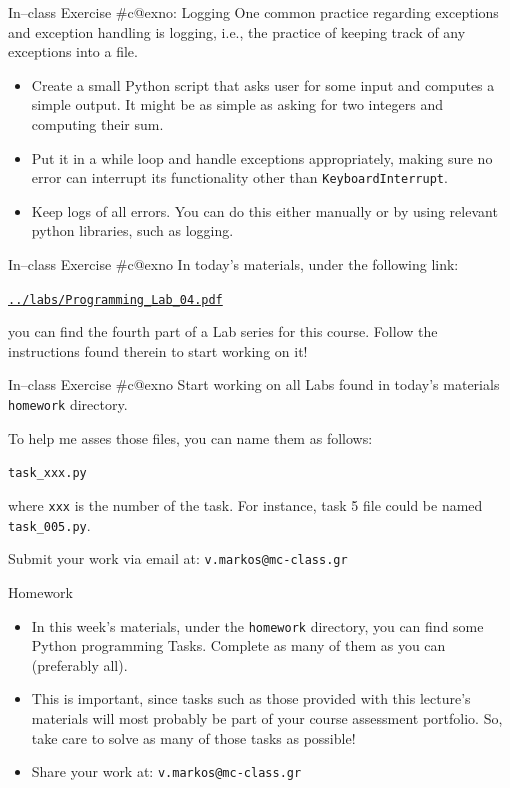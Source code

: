 \documentclass[aspectratio=169, 12pt, xcolor=table]{beamer}
\makeatletter
\newcommand{\ohref}[1]{\href{#1}{\texttt{#1}}}
\newcommand{\arabicthree}[1]{\expandafter\@arabicthree\csname c@#1\endcsname}
\newcommand{\@arabicthree}[1]{\ifnum #1<100 0\fi\ifnum #1<10 0\fi\number#1}
\newcounter{exno}
\newcommand{\exno}{\stepcounter{exno}In--class Exercise \#\arabicthree{exno}}
\makeatother
\begin{document}
	\begin{frame}{\exno: Logging}
		One common practice regarding exceptions and exception handling is logging, i.e., the practice of keeping track of any exceptions into a file.
		\begin{itemize}
			\item Create a small Python script that asks user for some input and computes a simple output. It might be as simple as asking for two integers and computing their sum.
			\item Put it in a while loop and handle exceptions appropriately, making sure no error can interrupt its functionality other than \texttt{KeyboardInterrupt}.
			\item Keep logs of all errors. You can do this either manually or by using relevant python libraries, such as logging.
		\end{itemize}
	\end{frame}
	
	\begin{frame}{\exno}		
		In today's materials, under the following link:
		\begin{center}
			\ohref{../labs/Programming\_Lab\_04.pdf}
		\end{center}
		you can find the fourth part of a Lab series for this course. Follow the instructions found therein to start working on it!
	\end{frame}
	
	\begin{frame}{\exno}
		Start working on all Labs found in today's materials \texttt{homework} directory.
		
		To help me asses those files, you can name them as follows:
		\begin{center}
			\texttt{task\_xxx.py}
		\end{center}
		where \texttt{xxx} is the number of the task. For instance, task 5 file could be named \texttt{task\_005.py}.
		
		Submit your work via email at: \texttt{v.markos@mc-class.gr}
	\end{frame}

	\begin{frame}{Homework}
		\begin{itemize}
			\item In this week's materials, under the \texttt{homework} directory, you can find some Python programming Tasks. Complete as many of them as you can (preferably all).
			\item This is important, since tasks such as those provided with this lecture's materials will most probably be part of your course assessment portfolio. So, take care to solve as many of those tasks as possible!
			\item Share your work at: \texttt{v.markos@mc-class.gr}
		\end{itemize}
	\end{frame}
\end{document}
